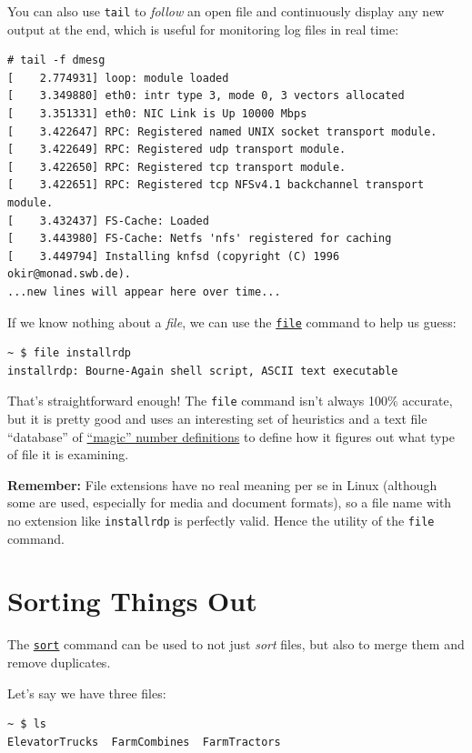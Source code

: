 \documentclass[10pt,]{book}
\numberwithin{figure}{chapter}
\begin{document}
You can also use \texttt{tail} to \emph{follow} an open file and
continuously display any new output at the end, which is useful for
monitoring log files in real time:

\begin{verbatim}
# tail -f dmesg
[    2.774931] loop: module loaded
[    3.349880] eth0: intr type 3, mode 0, 3 vectors allocated
[    3.351331] eth0: NIC Link is Up 10000 Mbps
[    3.422647] RPC: Registered named UNIX socket transport module.
[    3.422649] RPC: Registered udp transport module.
[    3.422650] RPC: Registered tcp transport module.
[    3.422651] RPC: Registered tcp NFSv4.1 backchannel transport module.
[    3.432437] FS-Cache: Loaded
[    3.443980] FS-Cache: Netfs 'nfs' registered for caching
[    3.449794] Installing knfsd (copyright (C) 1996 okir@monad.swb.de).
...new lines will appear here over time...
\end{verbatim}

If we know nothing about a \emph{file}, we can use the
\href{http://linux.die.net/man/1/file}{\texttt{file}} command to help us
guess:

\begin{verbatim}
~ $ file installrdp 
installrdp: Bourne-Again shell script, ASCII text executable
\end{verbatim}

That's straightforward enough! The \texttt{file} command isn't always
100\% accurate, but it is pretty good and uses an interesting set of
heuristics and a text file ``database'' of
\href{http://linux.die.net/man/5/magic}{``magic'' number definitions} to
define how it figures out what type of file it is examining.

\textbf{Remember:} File extensions have no real meaning per se in Linux
(although some are used, especially for media and document formats), so
a file name with no extension like \texttt{installrdp} is perfectly
valid. Hence the utility of the \texttt{file} command.

\section{Sorting Things Out}\label{sorting-things-out}

The \href{http://linux.die.net/man/1/sort}{\texttt{sort}} command can be
used to not just \emph{sort} files, but also to merge them and remove
duplicates.

Let's say we have three files:

\begin{verbatim}
~ $ ls
ElevatorTrucks  FarmCombines  FarmTractors
\end{verbatim}
\end{document}

